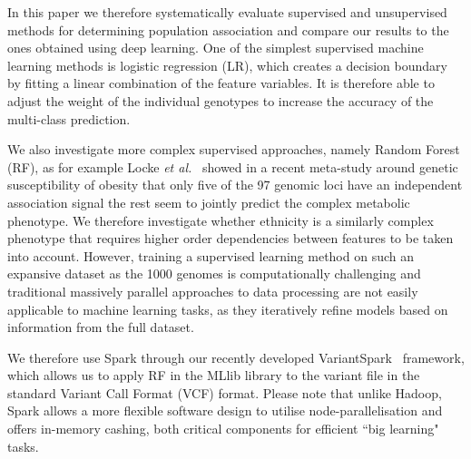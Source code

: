 \documentclass{llncs}
\newcommand{\variantSpark}{{\sc VariantSpark}}
\begin{document}
{In this paper we therefore systematically evaluate supervised and unsupervised methods for determining population association and compare our results to the ones obtained using deep learning. 
One of the simplest supervised machine learning methods is logistic regression (LR), which creates a decision boundary by fitting a linear combination of the feature variables. 
It is therefore able to adjust the weight of the individual genotypes to increase the accuracy of the multi-class prediction.    


 
We also investigate more complex supervised approaches, namely Random Forest (RF), as for example Locke {\it et al.}~\cite{Locke2015} showed in a recent meta-study around genetic susceptibility of obesity that only five of the 97 genomic loci have an independent association signal the rest seem to jointly predict the complex metabolic phenotype. 
We therefore investigate whether ethnicity is a similarly complex phenotype that requires higher order dependencies between features to be taken into account. %
However, training a supervised learning method on such an expansive dataset as the 1000 genomes is computationally challenging and traditional massively parallel approaches to data processing are not easily applicable to machine learning tasks, as they iteratively refine models based on information from the full dataset. 

We therefore use {\sc Spark} through our recently developed \variantSpark~\cite{OBrien} framework, which allows us to apply RF in the {\sc MLlib} library to the variant file in the standard Variant Call Format (VCF) format. 
Please note that unlike {\sc Hadoop}, {\sc Spark} allows a more flexible software design to utilise node-parallelisation and offers in-memory cashing, both critical components for efficient ``big learning" tasks. 

}
\end{document}
